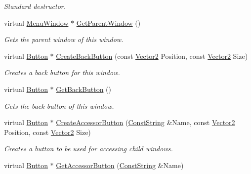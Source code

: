 \begin{DoxyCompactItemize}
\begin{DoxyCompactList}\small\item\em Standard destructor. \item\end{DoxyCompactList}\item 
virtual \hyperlink{classphys_1_1UI_1_1MenuWindow}{MenuWindow} $\ast$ \hyperlink{classphys_1_1UI_1_1MenuWindow_ac47ccc564f09ac33e13e56860b6ae281}{GetParentWindow} ()
\begin{DoxyCompactList}\small\item\em Gets the parent window of this window. \item\end{DoxyCompactList}\item 
virtual \hyperlink{classphys_1_1UI_1_1Button}{Button} $\ast$ \hyperlink{classphys_1_1UI_1_1MenuWindow_acb16433bca03c75b71ddb74d8df5b5ab}{CreateBackButton} (const \hyperlink{classphys_1_1Vector2}{Vector2} Position, const \hyperlink{classphys_1_1Vector2}{Vector2} Size)
\begin{DoxyCompactList}\small\item\em Creates a back button for this window. \item\end{DoxyCompactList}\item 
virtual \hyperlink{classphys_1_1UI_1_1Button}{Button} $\ast$ \hyperlink{classphys_1_1UI_1_1MenuWindow_a7c286758bac0e21154f41a56d9da8c08}{GetBackButton} ()
\begin{DoxyCompactList}\small\item\em Gets the back button of this window. \item\end{DoxyCompactList}\item 
virtual \hyperlink{classphys_1_1UI_1_1Button}{Button} $\ast$ \hyperlink{classphys_1_1UI_1_1MenuWindow_a268a077bde24ce6d1a2a4a9f1bf23ce0}{CreateAccessorButton} (\hyperlink{namespacephys_a5ce5049f8b4bf88d6413c47b504ebb31}{ConstString} \&Name, const \hyperlink{classphys_1_1Vector2}{Vector2} Position, const \hyperlink{classphys_1_1Vector2}{Vector2} Size)
\begin{DoxyCompactList}\small\item\em Creates a button to be used for accessing child windows. \item\end{DoxyCompactList}\item 
virtual \hyperlink{classphys_1_1UI_1_1Button}{Button} $\ast$ \hyperlink{classphys_1_1UI_1_1MenuWindow_a7ee13fd6573f8c6d4f6c4992d414e7c2}{GetAccessorButton} (\hyperlink{namespacephys_a5ce5049f8b4bf88d6413c47b504ebb31}{ConstString} \&Name)

\end{DoxyCompactItemize}
